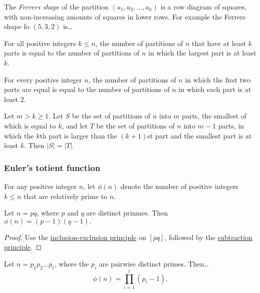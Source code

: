 The \emph{Ferrers shape} of the partition $(a_1,a_2,\dots,a_k)$ is a row diagram of squares, with non-increasing amounts of squares in lower rows. For example the Ferrers shape fo $(5,3,2)$ is\dots\newline



\begin{proposition}
For all positive integers $k \leq n$, the number of partitions of $n$ that have at least $k$ parts is equal to the number
of partitions of $n$ in which the largest part is at least $k$.
\end{proposition}

\begin{proposition}
For every positive integer $n$, the number of partitions of $n$ in which the first two parts are equal is equal to the number of partitions of $n$ 
in which each part is at least $2$.
\end{proposition}

\begin{lemma}
Let $m > k \geq 1$. Let $S$ be the set of partitions of $n$ into $m$ parts, the smallest of which is equal to $k$, and let $T$ be the set of partitions of 
$n$ into $m-1$ parts, in which the $k$th part is larger than the $(k+1)$st part and the smallest part is at least $k$.
Then $|S| = |T|$.
\end{lemma}

\subsubsection{Euler's totient function}\label{combinatoricstotient}

For any positive integer $n$, let $\phi(n)$ denote the number of positive integers $k \leq n$ that are relatively prime to $n$.

\begin{proposition}
Let $n = pq$, where $p$ and $q$ are distinct prinmes. Then $\phi(n) = (p-1)(q-1).$
\end{proposition}

\begin{proof}
Use the \hyperref[inclusionexclusion]{inclusion-exclusion principle} on $[pq]$, followed by the \hyperref[subtraction]{subtraction principle}.
\end{proof}

\begin{proposition}
Let $n = p_1p_2\dots p_t$, where the $p_i$ are pairwise distinct primes. Then\dots
$$\phi(n) = \prod^t_{i=1}(p_i - 1).$$
\end{proposition}

